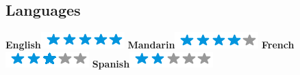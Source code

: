 \documentclass[]{cv}
\begin{document}
\begin{aside}
	\section{Languages \vspace{0.1cm}}
	\textbf{English}\includegraphics[scale=0.40]{img/5stars.png}
	\textbf{Mandarin}\includegraphics[scale=0.40]{img/4stars.png}
	\textbf{French}\includegraphics[scale=0.40]{img/3stars.png}
	\textbf{Spanish}\includegraphics[scale=0.40]{img/2stars.png}
	~
\end{aside}
\end{document}
